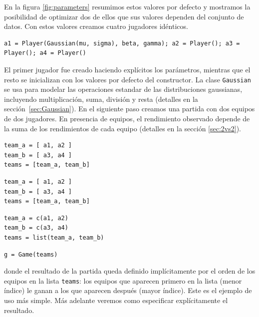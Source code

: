 \documentclass[a4paper,11pt]{book}
\theoremstyle{definition}
\begin{document}
%
En la figura \ref{fig:parameters} resumimos estos valores por defecto y mostramos la posibilidad de optimizar dos de ellos que sus valores dependen del conjunto de datos.
%
Con estos valores creamos cuatro jugadores id\'enticos.
%
\begin{lstlisting}[captionpos=b,backgroundcolor=\color{all},label=lst:player, caption={Inicializaci\'on de los jugadores}, belowskip=0cm]
a1 = Player(Gaussian(mu, sigma), beta, gamma); a2 = Player(); a3 = Player(); a4 = Player()
\end{lstlisting}
%
El primer jugador fue creado haciendo expl\'icitos los par\'ametros, mientras que el resto se inicializan con los valores por defecto del constructor.
%
La clase \texttt{Gaussian} se usa para modelar las operaciones estandar de las distribuciones gaussianas, incluyendo multiplicaci\'on, suma, divisi\'on y resta (detalles en la secci\'on~\ref{sec:Gaussian}).
%
En el siguiente paso creamos una partida con dos equipos de dos jugadores.
%
En presencia de equipos, el rendimiento observado depende de la suma de los rendimientos de cada equipo (detalles en la secci\'on \ref{sec:2vs2}).
%
\begin{paracol}{3}
\begin{lstlisting}[backgroundcolor=\color{julia!60}, belowskip=0cm]
team_a = [ a1, a2 ]
team_b = [ a3, a4 ]
teams = [team_a, team_b]
\end{lstlisting}
  \switchcolumn
\begin{lstlisting}[backgroundcolor=\color{python!60}, belowskip=0cm]
team_a = [ a1, a2 ]
team_b = [ a3, a4 ]
teams = [team_a, team_b]
\end{lstlisting}
   \switchcolumn
\begin{lstlisting}[backgroundcolor=\color{r!50}, belowskip=0cm]
team_a = c(a1, a2)
team_b = c(a3, a4)
teams = list(team_a, team_b)
\end{lstlisting}
\end{paracol}
\begin{lstlisting}[captionpos=b,backgroundcolor=\color{all},label=lst:game,caption={Equipos e inicializaci\'on del juego}, aboveskip=0cm,belowskip=0cm]
g = Game(teams)
\end{lstlisting}
%
donde el resultado de la partida queda definido impl\'icitamente por el orden de los equipos en la lista \texttt{teams}: los equipos que aparecen primero en la lista (menor \'indice) le ganan a los que aparecen despu\'es (mayor \'indice).
%
Este es el ejemplo de uso m\'as simple.
%
M\'as adelante veremos como especificar expl\'icitamente el resultado.
\end{document}

